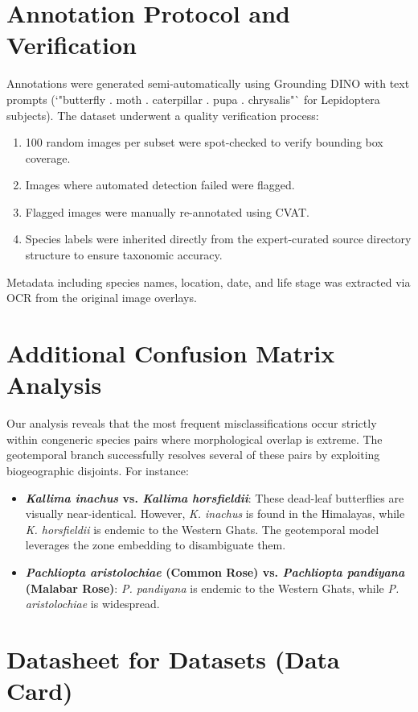 \documentclass[runningheads]{llncs}
\begin{document}
\section{Annotation Protocol and Verification}
Annotations were generated semi-automatically using Grounding DINO with text prompts (`"butterfly . moth . caterpillar . pupa . chrysalis"` for Lepidoptera subjects). 
The dataset underwent a quality verification process:
\begin{enumerate}
    \item 100 random images per subset were spot-checked to verify bounding box coverage.
    \item Images where automated detection failed were flagged.
    \item Flagged images were manually re-annotated using CVAT.
    \item Species labels were inherited directly from the expert-curated source directory structure to ensure taxonomic accuracy.
\end{enumerate}
Metadata including species names, location, date, and life stage was extracted via OCR from the original image overlays.

\section{Additional Confusion Matrix Analysis}
Our analysis reveals that the most frequent misclassifications occur strictly within congeneric species pairs where morphological overlap is extreme. The geotemporal branch successfully resolves several of these pairs by exploiting biogeographic disjoints. For instance:

\begin{itemize}
    \item \textbf{\textit{Kallima inachus} vs. \textit{Kallima horsfieldii}}: These dead-leaf butterflies are visually near-identical. However, \textit{K. inachus} is found in the Himalayas, while \textit{K. horsfieldii} is endemic to the Western Ghats. The geotemporal model leverages the zone embedding to disambiguate them.
    \item \textbf{\textit{Pachliopta aristolochiae} (Common Rose) vs. \textit{Pachliopta pandiyana} (Malabar Rose)}: \textit{P. pandiyana} is endemic to the Western Ghats, while \textit{P. aristolochiae} is widespread.
\end{itemize}

\section{Datasheet for Datasets (Data Card)}
\end{document}
